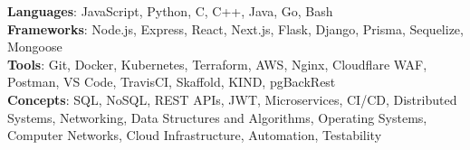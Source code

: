 \documentclass[letterpaper,11pt]{article}
\begin{document}
\begin{itemize}[leftmargin=0.15in, label={}]
\small{\item{

\textbf{Languages}{: JavaScript, Python, C, C++, Java, Go, Bash} \\

\textbf{Frameworks}{: Node.js, Express, React, Next.js, Flask, Django, Prisma, Sequelize, Mongoose} \\

\textbf{Tools}{: Git, Docker, Kubernetes, Terraform, AWS, Nginx, Cloudflare WAF, Postman, VS Code, TravisCI, Skaffold, KIND, pgBackRest} \\

\textbf{Concepts}{: SQL, NoSQL, REST APIs, JWT, Microservices, CI/CD, Distributed Systems, Networking, Data Structures and Algorithms, Operating Systems, Computer Networks, Cloud Infrastructure, Automation, Testability}

}}
\end{itemize}
\end{document}
